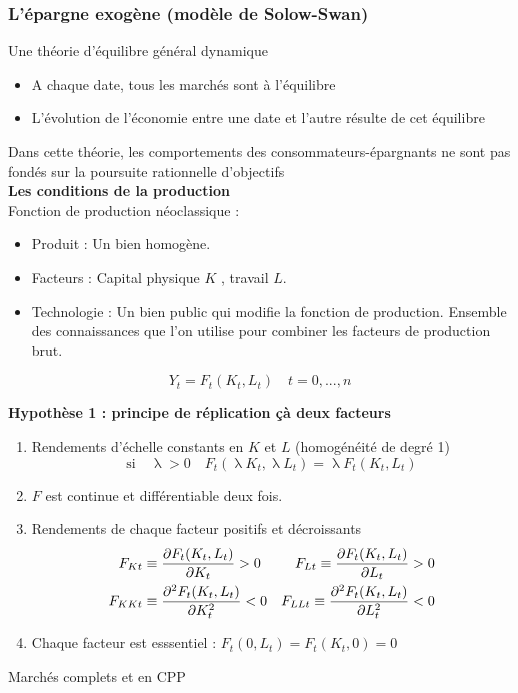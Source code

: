 \documentclass{article}
\begin{document}
\subsubsection{L'épargne exogène (modèle de Solow-Swan)}
Une théorie d'équilibre général dynamique
\begin{itemize}
	\item A chaque date, tous les marchés sont à l'équilibre
	\item L'évolution de l'économie entre une date et l'autre résulte de cet équilibre
\end{itemize}
Dans cette théorie, les comportements des consommateurs-épargnants ne sont pas fondés sur la poursuite rationnelle d'objectifs\\
\textbf{Les conditions de la production } \\
Fonction de production néoclassique : 
\begin{itemize}
	\item Produit : Un bien homogène.
	\item Facteurs : Capital physique \(K\) , travail \(L\).
	\item Technologie : Un bien public qui modifie la fonction de production. Ensemble des connaissances que l'on utilise pour combiner les facteurs de production brut.
\end{itemize}
\[Y_t = F_t(K_t, L_t) \quad t = 0, ..., n\]
\newpage
\begin{center}
\textbf{Hypothèse 1 : principe de réplication çà deux facteurs}
\end{center}
\begin{enumerate}
	\item Rendements d'échelle constants en \(K\) et \(L\) (homogénéité de degré 1)
	\[ \textrm{si} \quad \uplambda >0 \quad F_t(\uplambda K_t, \uplambda L_t) = \uplambda F_t (K_t, L_t)\]
	\item \(F\) est continue et différentiable deux fois.
	\item Rendements de chaque facteur positifs et décroissants
	\begin{align*}
		F_{Kt} &\equiv \pdv{F_t(K_t, L_t)}{K_t} > 0 &F_{Lt} \equiv \pdv{F_t(K_t, L_t)}{L_t} >0 \\
		F_{KKt} &\equiv \pdv[2]{F_t(K_t, L_t)}{K_t} < 0 &F_{LLt} \equiv \pdv[2]{F_t(K_t, L_t)}{L_t} < 0 
	\end{align*}
	\item Chaque facteur est esssentiel : \(F_t(0, L_t) = F_t(K_t,0) = 0\)
\end{enumerate}
Marchés complets et en CPP
\end{document}
